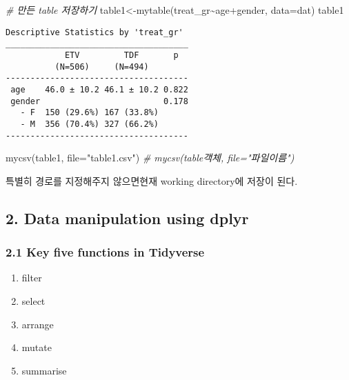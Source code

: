 \documentclass[
]{article}
\newenvironment{Shaded}{\begin{snugshade}}{\end{snugshade}}
\newcommand{\AttributeTok}[1]{\textcolor[rgb]{0.77,0.63,0.00}{#1}}
\newcommand{\CommentTok}[1]{\textcolor[rgb]{0.56,0.35,0.01}{\textit{#1}}}
\newcommand{\FunctionTok}[1]{\textcolor[rgb]{0.00,0.00,0.00}{#1}}
\newcommand{\NormalTok}[1]{#1}
\newcommand{\OtherTok}[1]{\textcolor[rgb]{0.56,0.35,0.01}{#1}}
\newcommand{\SpecialCharTok}[1]{\textcolor[rgb]{0.00,0.00,0.00}{#1}}
\newcommand{\StringTok}[1]{\textcolor[rgb]{0.31,0.60,0.02}{#1}}
\providecommand{\tightlist}{%
  \setlength{\itemsep}{0pt}\setlength{\parskip}{0pt}}
\begin{document}
\begin{Shaded}
\begin{Highlighting}[]
\CommentTok{\# 만든 table 저장하기}
\NormalTok{table1}\OtherTok{\textless{}{-}}\FunctionTok{mytable}\NormalTok{(treat\_gr}\SpecialCharTok{\textasciitilde{}}\NormalTok{age}\SpecialCharTok{+}\NormalTok{gender, }\AttributeTok{data=}\NormalTok{dat)}
\NormalTok{table1}
\end{Highlighting}
\end{Shaded}

\begin{verbatim}
Descriptive Statistics by 'treat_gr'
_____________________________________ 
            ETV         TDF       p  
          (N=506)     (N=494)  
------------------------------------- 
 age    46.0 ± 10.2 46.1 ± 10.2 0.822
 gender                         0.178
   - F  150 (29.6%) 167 (33.8%)      
   - M  356 (70.4%) 327 (66.2%)      
------------------------------------- 
\end{verbatim}

\begin{Shaded}
\begin{Highlighting}[]
\FunctionTok{mycsv}\NormalTok{(table1, }\AttributeTok{file=}\StringTok{"table1.csv"}\NormalTok{) }
\CommentTok{\# mycsv(table객체, file="파일이름")}
\end{Highlighting}
\end{Shaded}

특별히 경로를 지정해주지 않으면현재 working directory에 저장이 된다.

\hypertarget{data-manipulation-using-dplyr}{%
\subsection{2. Data manipulation using
dplyr}\label{data-manipulation-using-dplyr}}

\hypertarget{key-five-functions-in-tidyverse}{%
\subsubsection{2.1 Key five functions in
Tidyverse}\label{key-five-functions-in-tidyverse}}

\begin{enumerate}
\def\labelenumi{\arabic{enumi}.}
\tightlist
\item
  filter
\item
  select
\item
  arrange
\item
  mutate
\item
  summarise
\end{enumerate}
\end{document}
